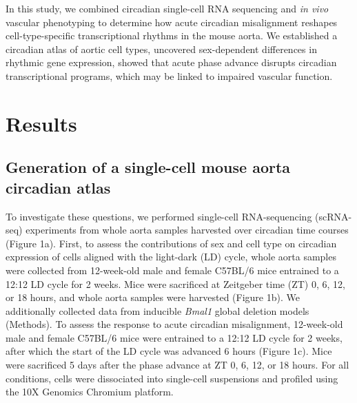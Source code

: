 \documentclass[12pt]{article}
\begin{document}
In this study, we combined circadian single-cell RNA sequencing and \textit{in vivo} vascular phenotyping to determine how acute circadian misalignment reshapes cell-type-specific transcriptional rhythms in the mouse aorta. We established a circadian atlas of aortic cell types, uncovered sex-dependent differences in rhythmic gene expression, showed that acute phase advance disrupts circadian transcriptional programs, which may be linked to impaired vascular function.

\section*{Results}

\subsection*{Generation of a single-cell mouse aorta circadian atlas}

To investigate these questions, we performed single-cell RNA-sequencing (scRNA-seq)
experiments from whole aorta samples harvested over circadian time courses (Figure 1a).
First, to assess the contributions of sex and cell type on circadian expression of cells aligned
with the light-dark (LD) cycle, whole aorta samples were collected from 12-week-old male and female
C57BL/6 mice entrained to a 12:12 LD cycle for 2 weeks. Mice were sacrificed at Zeitgeber time (ZT)
0, 6, 12, or 18 hours, and whole aorta samples were harvested (Figure 1b). We
additionally collected data from inducible \textit{Bmal1} global deletion models (Methods). To assess the response to acute circadian
misalignment, 12-week-old male and female C57BL/6 mice were entrained to a 12:12 LD cycle for 2
weeks, after which the start of the LD cycle was advanced 6 hours (Figure 1c). Mice were
sacrificed 5 days after the phase advance at ZT 0, 6, 12, or 18 hours. For all conditions, cells
were dissociated into single-cell suspensions and profiled using the 10X Genomics Chromium platform.
\end{document}
